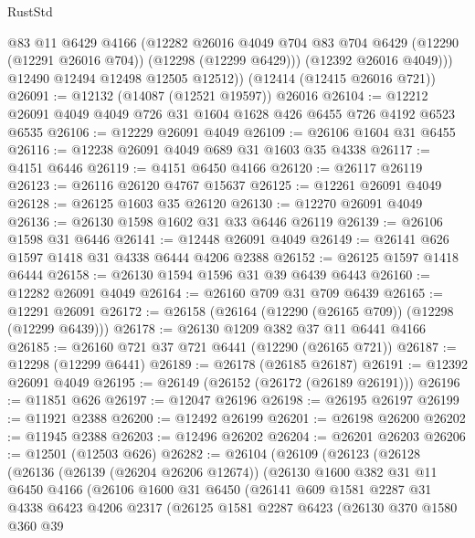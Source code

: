 \begin{lexlean}{RustStd}
\begin{coremodule}
            @83
            @11
            @6429
            @4166
            (@12282
              @26016
              @4049
              @704
              @83
              @704
              @6429
              (@12290 (@12291 @26016 @704))
              (@12298 (@12299 @6429)))
            (@12392 @26016 @4049)))
        @12490
        @12494
        @12498
        @12505
        @12512))
    (@12414 (@12415 @26016 @721))
@26091 := @12132 (@14087 (@12521 @19597)) @26016
@26104 := @12212 @26091 @4049 @4049 @726 @31 @1604 @1628 @426 @6455 @726 @4192 @6523 @6535
@26106 := @12229 @26091 @4049
@26109 := @26106 @1604 @31 @6455
@26116 := @12238 @26091 @4049 @689 @31 @1603 @35 @4338
@26117 := @4151 @6446
@26119 := @4151 @6450 @4166
@26120 := @26117 @26119
@26123 := @26116 @26120 @4767 @15637
@26125 := @12261 @26091 @4049
@26128 := @26125 @1603 @35 @26120
@26130 := @12270 @26091 @4049
@26136 := @26130 @1598 @1602 @31 @33 @6446 @26119
@26139 := @26106 @1598 @31 @6446
@26141 := @12448 @26091 @4049
@26149 := @26141 @626 @1597 @1418 @31 @4338 @6444 @4206 @2388
@26152 := @26125 @1597 @1418 @6444
@26158 := @26130 @1594 @1596 @31 @39 @6439 @6443
@26160 := @12282 @26091 @4049
@26164 := @26160 @709 @31 @709 @6439
@26165 := @12291 @26091
@26172 := @26158 (@26164 (@12290 (@26165 @709)) (@12298 (@12299 @6439)))
@26178 := @26130 @1209 @382 @37 @11 @6441 @4166
@26185 := @26160 @721 @37 @721 @6441 (@12290 (@26165 @721))
@26187 := @12298 (@12299 @6441)
@26189 := @26178 (@26185 @26187)
@26191 := @12392 @26091 @4049
@26195 := @26149 (@26152 (@26172 (@26189 @26191)))
@26196 := @11851 @626
@26197 := @12047 @26196
@26198 := @26195 @26197
@26199 := @11921 @2388
@26200 := @12492 @26199
@26201 := @26198 @26200
@26202 := @11945 @2388
@26203 := @12496 @26202
@26204 := @26201 @26203
@26206 := @12501 (@12503 @626)
@26282 := @26104
    (@26109
      (@26123
        (@26128
          (@26136
            (@26139 (@26204 @26206 @12674))
            (@26130
              @1600
              @382
              @31
              @11
              @6450
              @4166
              (@26106
                @1600
                @31
                @6450
                (@26141
                  @609
                  @1581
                  @2287
                  @31
                  @4338
                  @6423
                  @4206
                  @2317
                  (@26125
                    @1581
                    @2287
                    @6423
                    (@26130
                      @370
                      @1580
                      @360
                      @39

\end{coremodule}
\end{lexlean}
